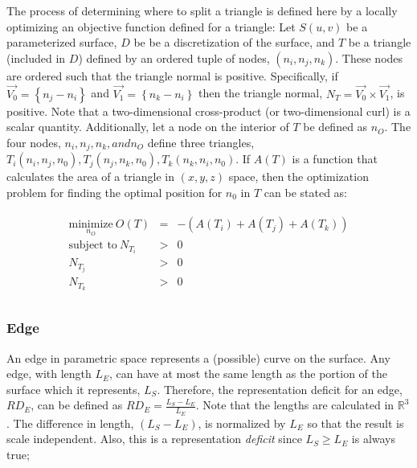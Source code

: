 The process of determining where to split a triangle is defined here by
a locally optimizing an objective function defined for a triangle: Let
$S(u,v)$ be a parameterized surface, $D$ be be a discretization of the
surface, and $T$ be a triangle (included in $D$) defined by an ordered
tuple of nodes, $\left(n_i, n_j, n_k\right)$. These nodes are ordered
such that the triangle normal is positive. Specifically, if $\vec{V_0} =
\left\{n_j - n_i \right\}$ and $\vec{V_1} = \left\{n_k - n_i\right\}$
then the triangle normal, $N_T = \vec{V_0} \times \vec{V_1}$, is
positive. Note that a two-dimensional cross-product (or two-dimensional
curl) is a scalar quantity. Additionally, let a node on the interior of
$T$ be defined as $n_O$. The four nodes, $n_i, n_j, n_k, and n_O$ define
three triangles, $T_i\left(n_i,n_j,n_0\right), T_j\left(n_j, n_k,
n_0\right), T_k\left(n_k, n_i, n_0\right)$. If $A(T)$ is a function that
calculates the area of a triangle in $\left(x,y,z\right)$ space, then
the optimization problem for finding the optimal position for $n_0$ in
$T$ can be stated as:

\begin{eqnarray*}
\begin{array}{rcl}
\underset{n_O}{\text{minimize}} \ O(T) & = & -\left(A\left(T_i\right) + A\left(T_j\right) + A\left(T_k\right) \right) \\
\text{subject to} \ N_{T_i} & > & 0 \\
N_{T_j} & > & 0 \\ 
N_{T_k} & > & 0 \\
\end{array}
\end{eqnarray*}

\subsubsection{Edge}
An edge in parametric space represents a (possible) curve on the
surface. Any edge, with length $L_E$, can have at most the same length
as the portion of the surface which it represents, $L_S$. Therefore, the
representation deficit for an edge, $RD_E$, can be defined as $RD_E =
\frac{L_S - L_E}{L_E}$. Note that the lengths are calculated in
${\mathbb R}^3$. The difference in length, $\left(L_S - L_E\right)$, is
normalized by $L_E$ so that the result is scale independent. Also, this
is a representation {\it deficit} since $L_S \ge L_E$ is always true;

